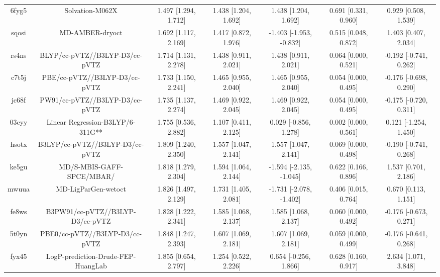 \documentclass{article}
\begin{document}
\begin{center}
\begin{longtable}{|ccccccc|}
 6fyg5 &                                    Solvation-M062X &  1.497 [1.294, 1.712] &  1.438 [1.204, 1.692] &     1.438 [1.204, 1.692] &  0.691 [0.331, 0.960] &    0.929 [0.508, 1.539] \\
 sqosi &                                    MD-AMBER-dryoct &  1.692 [1.117, 2.169] &  1.417 [0.872, 1.976] &  -1.403 [-1.953, -0.832] &  0.515 [0.048, 0.872] &    1.403 [0.407, 2.034] \\
 rs4ns &                     BLYP/cc-pVTZ//B3LYP-D3/cc-pVTZ &  1.714 [1.131, 2.278] &  1.438 [0.911, 2.021] &     1.438 [0.911, 2.021] &  0.064 [0.000, 0.521] &  -0.192 [-0.741, 0.262] \\
 c7t5j &                      PBE/cc-pVTZ//B3LYP-D3/cc-pVTZ &  1.733 [1.150, 2.241] &  1.465 [0.955, 2.040] &     1.465 [0.955, 2.040] &  0.054 [0.000, 0.495] &  -0.176 [-0.698, 0.290] \\
 jc68f &                     PW91/cc-pVTZ//B3LYP-D3/cc-pVTZ &  1.735 [1.137, 2.274] &  1.469 [0.922, 2.045] &     1.469 [0.922, 2.045] &  0.054 [0.000, 0.495] &  -0.175 [-0.720, 0.311] \\
 03cyy &                   Linear Regression-B3LYP/6-311G** &  1.755 [0.536, 2.882] &  1.107 [0.411, 2.125] &    0.029 [-0.856, 1.278] &  0.002 [0.000, 0.561] &   0.121 [-1.254, 1.450] \\
 hsotx &                    B3LYP/cc-pVTZ//B3LYP-D3/cc-pVTZ &  1.809 [1.240, 2.350] &  1.557 [1.047, 2.141] &     1.557 [1.047, 2.141] &  0.069 [0.000, 0.498] &  -0.190 [-0.741, 0.268] \\
 ke5gu &                          MD/S-MBIS-GAFF-SPCE/MBAR/ &  1.818 [1.279, 2.304] &  1.594 [1.064, 2.144] &  -1.594 [-2.135, -1.045] &  0.622 [0.166, 0.896] &    1.537 [0.701, 2.186] \\
 mwuua &                                MD-LigParGen-wetoct &  1.826 [1.497, 2.129] &  1.731 [1.405, 2.081] &  -1.731 [-2.078, -1.402] &  0.406 [0.015, 0.764] &    0.670 [0.113, 1.151] \\
 fe8ws &                   B3PW91/cc-pVTZ//B3LYP-D3/cc-pVTZ &  1.828 [1.222, 2.341] &  1.585 [1.068, 2.137] &     1.585 [1.068, 2.137] &  0.060 [0.000, 0.492] &  -0.176 [-0.673, 0.271] \\
 5t0yn &                     PBE0/cc-pVTZ//B3LYP-D3/cc-pVTZ &  1.848 [1.247, 2.393] &  1.607 [1.069, 2.181] &     1.607 [1.069, 2.181] &  0.059 [0.000, 0.499] &  -0.176 [-0.641, 0.268] \\
 fyx45 &                 LogP-prediction-Drude-FEP-HuangLab &  1.855 [0.654, 2.797] &  1.254 [0.522, 2.226] &    0.654 [-0.256, 1.866] &  0.628 [0.160, 0.917] &    2.634 [1.071, 3.848] \\

\end{longtable}
\end{center}
\end{document}
